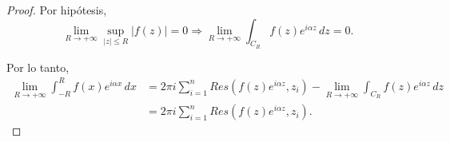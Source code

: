 \begin{proof}
Por hipótesis,
$$\lim_{R\to + \infty} \sup_{|z| \leq R} |f(z)| = 0  \Rightarrow \lim_{R \to + \infty} \int_{C_R} f(z) e^{i\alpha z} \,dz   = 0.$$

Por lo tanto,
\begin{align*}
\lim_{R\to + \infty} \int_{-R}^R f(x) e^{i\alpha x}\,dx &= 2\pi i \sum_{i=1}^n Res(f(z) e^{i\alpha z},z_i) - \lim_{R\to + \infty} \int_{C_R} f(z) e^{i\alpha z} \,dz  \\
&= 2\pi i \sum_{i=1}^n Res(f(z) e^{i\alpha z},z_i).    
\end{align*}

\end{proof}

